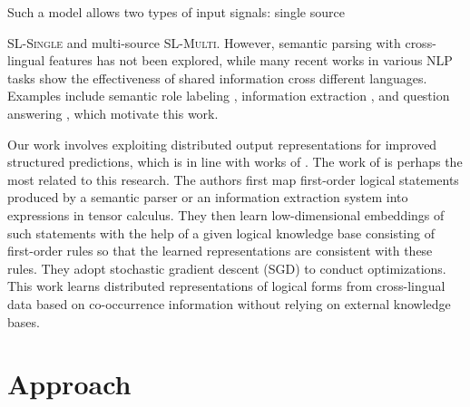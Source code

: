 \documentclass[11pt,a4paper]{article}
\begin{document}
Such a model allows two types of input signals: single source {SL-{\textsc{Single}} and multi-source  {SL-{\textsc{Multi}}}.
However, semantic parsing with cross-lingual features has not been explored, while many recent works in various NLP tasks show the effectiveness of shared information cross different languages. Examples include semantic role labeling \cite{kozhevnikov13crosssrl}, information extraction \cite{jeff13transfer,heng17tagging,radu17ner}, and question answering \cite{israa17qa}, which motivate this work.
%

{Our work involves exploiting distributed output representations for improved structured predictions, which is in line with works of \cite{NIPS2014_5323,W14-2409,xiaoguo15adaption}.
The work of \cite{W14-2409} is perhaps the most related to this research.
The authors first map first-order logical statements produced by a semantic parser or an information extraction system into expressions in tensor calculus.
They then learn low-dimensional embeddings of such statements with the help of a given logical knowledge base consisting of first-order rules so that the learned representations are consistent with these rules.
They adopt stochastic gradient descent (SGD) to conduct optimizations. This work learns distributed representations of logical forms from cross-lingual data based on co-occurrence information without relying on external knowledge bases.
}

\section{Approach}

}
\end{document}
